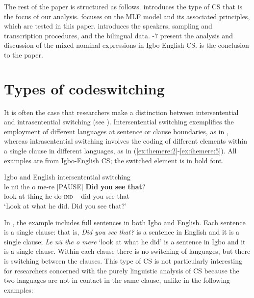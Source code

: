 \documentclass[output=paper]{langsci/langscibook}
\begin{document}
The rest of the paper is structured as follows.  introduces the type of CS that is the focus of our analysis.  focuses on the MLF model and its associated principles, which are tested in this paper.  introduces the speakers, sampling and transcription procedures, and the bilingual data. -7 present the analysis and discussion of the mixed nominal expressions in Igbo-English CS.  is the conclusion to the paper.  

\section{Types of codeswitching}\label{sec:ihemere:2}

It is often the case that researchers make a distinction between intersentential and intrasentential switching (see \citealt{Clyne2003}). Intersentential switching exemplifies the employment of different languages at sentence or clause boundaries, as in , whereas intrasentential switching involves the coding of different elements within a single clause in different languages, as in (\ref{ex:ihemere:2}-\ref{ex:ihemere:5}). All examples are from Igbo-English CS; the switched element is in bold font.

\ea\label{ex:ihemere:1}
{Igbo and English intersentential switching\rmfnm{}}\\
\gll le    nü  ihe  o   me-re    		[PAUSE] \textbf{Did} \textbf{you} \textbf{see} \textbf{that}?\\
     look  at  thing  he do-\textsc{ind}        ~         did  you see that\\
\glt ‘Look at what he did. Did you see that?’
\z
{}


In , the example includes full sentences in both Igbo and English. Each sentence is a single clause: that is, \textit{Did you see that?} is a sentence in English and it is a single clause; \textit{Le nü ihe o mere} ‘look at what he did’ is a sentence in Igbo and it is a single clause. Within each clause there is no switching of languages, but there is switching between the clauses. This type of CS is not particularly interesting for researchers concerned with the purely linguistic analysis of CS because the two languages are not in contact in the same clause, unlike in the following examples:
\end{document}
